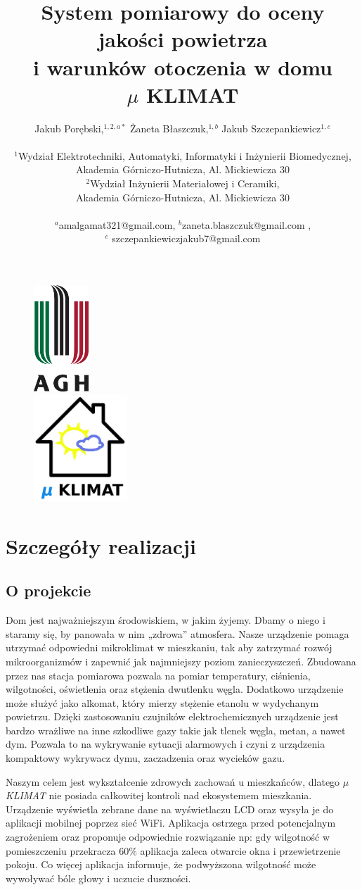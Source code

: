 \documentclass[12pt,a4paper]{article}
\author
{Jakub Porębski,$^{1,2,a\ast}$ Żaneta Błaszczuk,$^{1,b}$ Jakub Szczepankiewicz$^{1, c}$\\
\\
\normalsize{$^{1}$Wydział Elektrotechniki, Automatyki, Informatyki i Inżynierii Biomedycznej,}\\
\normalsize{Akademia Górniczo-Hutnicza, Al. Mickiewicza 30}\\
\normalsize{$^{2}$Wydział Inżynierii Materiałowej i Ceramiki,}\\ \normalsize{Akademia Górniczo-Hutnicza, Al. Mickiewicza 30}\\
\\
\normalsize{$^a$amalgamat321@gmail.com, $^b$zaneta.blaszczuk@gmail.com ,}\\
\normalsize{$^c$ szczepankiewiczjakub7@gmail.com}
}
\title{System pomiarowy do oceny jakości powietrza \\i warunków otoczenia w domu \\ \Huge{$\mu$ KLIMAT}}
\date{}
\begin{document}
%
\maketitle
\begin{figure}[!h]
\centering
	\includegraphics[height =40mm]{agh.jpg}\\[1cm]
	\includegraphics[height =40mm]{logo.jpg}
\end{figure}
\newpage


\section{Szczegóły realizacji}
\subsection{O projekcie}
Dom jest najważniejszym środowiskiem, w jakim żyjemy. Dbamy o niego i staramy się, by panowała w nim „zdrowa” atmosfera. Nasze urządzenie pomaga utrzymać odpowiedni mikroklimat w mieszkaniu, tak aby zatrzymać rozwój mikroorganizmów i zapewnić jak najmniejszy poziom zanieczyszczeń. Zbudowana przez nas stacja pomiarowa pozwala na pomiar temperatury, ciśnienia, wilgotności, oświetlenia oraz stężenia dwutlenku węgla. Dodatkowo urządzenie może służyć jako alkomat, który mierzy stężenie etanolu w wydychanym powietrzu. Dzięki zastosowaniu czujników elektrochemicznych urządzenie jest bardzo wrażliwe na inne szkodliwe gazy takie jak tlenek węgla, metan, a nawet dym. Pozwala to na wykrywanie sytuacji alarmowych i czyni z urządzenia kompaktowy wykrywacz dymu, zaczadzenia oraz wycieków gazu.

Naszym celem jest wykształcenie zdrowych zachowań u mieszkańców, dlatego \textit{$\mu$KLIMAT} nie posiada całkowitej kontroli nad ekosystemem mieszkania. Urządzenie wyświetla zebrane dane na wyświetlaczu LCD oraz wysyła je do aplikacji mobilnej poprzez sieć WiFi. Aplikacja ostrzega przed potencjalnym zagrożeniem oraz proponuje odpowiednie rozwiązanie np: gdy wilgotność w pomieszczeniu przekracza 60\% aplikacja zaleca otwarcie okna i przewietrzenie pokoju. Co więcej aplikacja informuje, że podwyższona wilgotność może wywoływać bóle głowy i uczucie duszności. 
\end{document}
